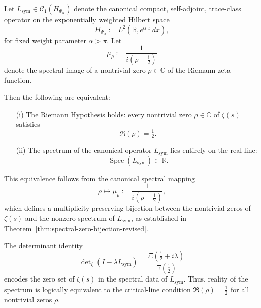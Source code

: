\begin{theorem}
\label{thm:rh_spectrum_equiv}
Let \( L_{\mathrm{sym}} \in \mathcal{C}_1(H_{\Psi_\alpha}) \) denote the canonical compact, self-adjoint, trace-class operator on the exponentially weighted Hilbert space
\[
H_{\Psi_\alpha} := L^2(\mathbb{R}, e^{\alpha |x|} dx),
\]
for fixed weight parameter \( \alpha > \pi \). Let
\[
\mu_\rho := \frac{1}{i(\rho - \tfrac{1}{2})}
\]
denote the spectral image of a nontrivial zero \( \rho \in \mathbb{C} \) of the Riemann zeta function.

Then the following are equivalent:
\begin{enumerate}
  \item[\textup{(i)}] The Riemann Hypothesis holds: every nontrivial zero \( \rho \in \mathbb{C} \) of \( \zeta(s) \) satisfies
  \[
  \Re(\rho) = \tfrac{1}{2}.
  \]

  \item[\textup{(ii)}] The spectrum of the canonical operator \( L_{\mathrm{sym}} \) lies entirely on the real line:
  \[
  \operatorname{Spec}(L_{\mathrm{sym}}) \subset \mathbb{R}.
  \]
\end{enumerate}

\medskip
\noindent
This equivalence follows from the canonical spectral mapping
\[
\rho \mapsto \mu_\rho := \frac{1}{i(\rho - \tfrac{1}{2})},
\]
which defines a multiplicity-preserving bijection between the nontrivial zeros of \( \zeta(s) \) and the nonzero spectrum of \( L_{\mathrm{sym}} \), as established in Theorem~\ref{thm:spectral-zero-bijection-revised}.

The determinant identity
\[
\det\nolimits_\zeta(I - \lambda L_{\mathrm{sym}}) = \frac{\Xi\left( \tfrac{1}{2} + i\lambda \right)}{\Xi\left( \tfrac{1}{2} \right)}
\]
encodes the zero set of \( \zeta(s) \) in the spectral data of \( L_{\mathrm{sym}} \). Thus, reality of the spectrum is logically equivalent to the critical-line condition \( \Re(\rho) = \tfrac{1}{2} \) for all nontrivial zeros \( \rho \).
\end{theorem}
